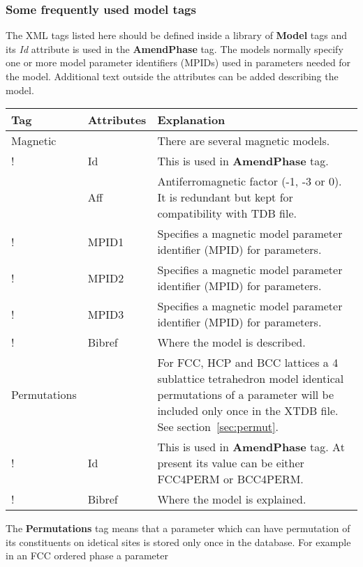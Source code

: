 \documentclass{article}
\begin{document}
\subsubsection{Some frequently used model tags}

The XML tags listed here should be defined inside a library of {\bf
  Model} tags and its {\em Id} attribute is used in the {\bf
  AmendPhase} tag.  The models normally specify one or more model
parameter identifiers (MPIDs) used in parameters needed for the model.
Additional text outside the attributes can be added describing the
model.

\bigskip
\begin{tabular}{|p{} p{} p{}|}\hline
  Tag & Attributes & Explanation\\\hline

  Magnetic & & There are several magnetic models.\\
!      & Id & This is used in {\bf AmendPhase} tag.\\
      & Aff   & Antiferromagnetic factor (-1, -3 or 0).  It is
                    redundant but kept for compatibility with TDB file.\\
!      & MPID1 & Specifies a magnetic model parameter 
                    identifier (MPID) for parameters.\\
!      & MPID2 & Specifies a magnetic model parameter 
                    identifier (MPID) for parameters.\\
!      & MPID3 & Specifies a magnetic model parameter 
                    identifier (MPID) for parameters.\\
!      & Bibref & Where the model is described.\\\hline

 Permutations & & For FCC, HCP and BCC lattices a 4 sublattice tetrahedron model
                  identical permutations of a parameter will be included 
                  only once in the XTDB file.  See section~\ref{sec:permut}.\\
!     & Id & This is used in {\bf AmendPhase} tag.  At present its value
                   can be either FCC4PERM or BCC4PERM.\\
!     & Bibref & Where the model is explained.\\\hline

\end{tabular}

The {\bf Permutations} tag means that a parameter which can have
permutation of its constituents on idetical sites is stored only once
in the database.  For example in an FCC ordered phase a parameter
\end{document}
